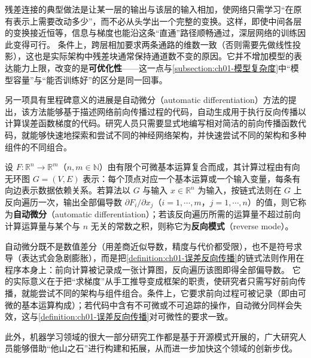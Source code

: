 \documentclass[../../main.tex]{subfiles}
\begin{document}
\begin{remark}
残差连接的典型做法是让某一层的输出与该层的输入相加，使网络只需学习“在原有表示上需要改动多少”，而不必从头学出一个完整的变换。这样，即使中间各层的变换接近恒等，信息与梯度也能沿这条“直通”路径顺畅通过，深层网络的训练因此变得可行。
条件上，跨层相加要求两条通路的维数一致（否则需要先做线性投影），这也是实际架构中残差块通常保持通道数不变的原因。它并不增加模型的表达能力上限，改变的是\textbf{可优化性}——这一点与\cref{subsection:ch01-模型复杂度}中“模型容量”与“能否训练好”的区分是同一回事。
\end{remark}

另一项具有里程碑意义的进展是自动微分（automatic differentiation）方法的提出，该方法能够基于描述网络前向传播过程的代码，自动生成用于执行反向传播以计算误差函数梯度的代码。研究人员只需要显式地编写相对简洁的前向传播函数代码，就能够快速地探索和尝试不同的神经网络架构，并快速尝试不同的架构和多种组件的不同组合。

\begin{definition}[自动微分]\label{definition:ch01-自动微分}
设 $F:\mathbb{R}^{n}\to\mathbb{R}^{m}$（$n,m\in\mathbb{N}$）由有限个可微基本运算复合而成，其计算过程由有向无环图 $G=(V,E)$ 表示：每个顶点对应一个基本运算或一个输入变量，每条有向边表示数据依赖关系。若算法以 $G$ 与输入 $x\in\mathbb{R}^{n}$ 为输入，按链式法则在 $G$ 上反向遍历一次，输出全部偏导数 $\partial F_{i}/\partial x_{j}$（$i=1,\cdots,m$，$j=1,\cdots,n$）的值，则它称为\textbf{自动微分}（automatic differentiation）；若该反向遍历所需的运算量不超过前向计算运算量与某个与 $n$ 无关的常数之积，则称它为\textbf{反向模式}（reverse mode）。
\end{definition}

\begin{remark}
自动微分既不是数值差分（用差商近似导数，精度与代价都受限），也不是符号求导（表达式会急剧膨胀），而是把\cref{definition:ch01-误差反向传播}的链式法则作用在程序本身上：前向计算被记录成一张计算图，反向遍历该图即得全部偏导数。
它的实际意义在于把“求梯度”从手工推导变成框架的职责，使研究者只需写好前向传播，就能尝试不同的架构与组件组合。条件上，它要求前向过程可被记录（即由可微的基本运算构成）；若代码中含有不可微或不可追踪的操作，自动微分同样会失效，这与\cref{definition:ch01-误差反向传播}对可微性的要求一致。
\end{remark}

此外，机器学习领域的很大一部分研究工作都是基于开源模式开展的，广大研究人员能够借助“他山之石”进行构建和拓展，从而进一步加快这个领域的创新步伐。
\end{document}
